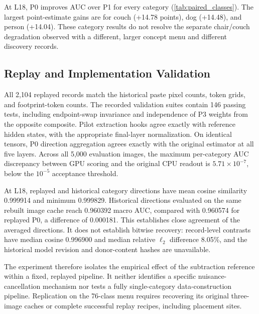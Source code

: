 At L18, P0 improves AUC over P1 for every category
(\cref{tab:paired_classes}). The largest point-estimate gains are for
couch (+14.78 points), dog (+14.48), and person (+14.04). These category
results do not resolve the separate chair/couch degradation observed with
a different, larger concept menu and different discovery records.

\subsection{Replay and Implementation Validation}

All 2,104 replayed records match the historical paste pixel counts, token
grids, and footprint-token counts. The recorded validation suites contain
146 passing tests, including endpoint-swap invariance and independence
of P3 weights from the opposite composite. Pilot extraction hooks agree
exactly with reference hidden states, with the appropriate final-layer
normalization. On identical tensors, P0 direction aggregation agrees
exactly with the original estimator at all five layers. Across all
5,000 evaluation images, the maximum per-category AUC discrepancy between
GPU scoring and the original CPU readout is \(5.71\times10^{-7}\),
below the \(10^{-5}\) acceptance threshold.

At L18, replayed and historical category directions have mean cosine
similarity 0.999914 and minimum 0.999829. Historical directions evaluated
on the same rebuilt image cache reach 0.960392 macro AUC, compared with
0.960574 for replayed P0, a difference of 0.000181. This establishes close
agreement of the averaged directions. It does not establish bitwise
recovery: record-level contrasts have median cosine 0.996900 and median
relative \(\ell_2\) difference 8.05\%, and the historical model revision
and donor-content hashes are unavailable.

The experiment therefore isolates the empirical effect of the subtraction
reference within a fixed, replayed pipeline. It neither identifies a
specific nuisance-cancellation mechanism nor tests a fully single-category
data-construction pipeline. Replication on the 76-class menu requires
recovering its original three-image caches or complete successful replay
recipes, including placement sites.
